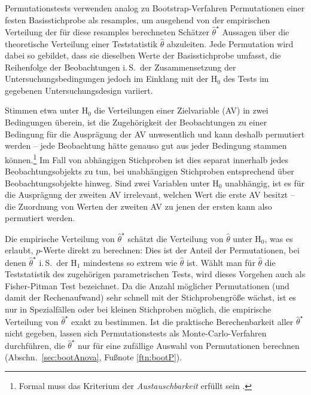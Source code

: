 Permutationstests \cite{Chihara2011,Good2004} verwenden analog zu Bootstrap-Verfahren Permutationen einer festen Basisstichprobe als resamples, um ausgehend von der empirischen Verteilung der für diese resamples berechneten Schätzer $\hat{\theta}^{\star}$ Aussagen über die theoretische Verteilung einer Teststatistik $\hat{\theta}$ abzuleiten. Jede Permutation wird dabei so gebildet, dass sie dieselben Werte der Basisstichprobe umfasst, die Reihenfolge der Beobachtungen i.\,S.\ der Zusammensetzung der Untersuchungsbedingungen jedoch im Einklang mit der $\text{H}_{0}$ des Tests im gegebenen Untersuchungsdesign variiert.

Stimmen etwa unter $\text{H}_{0}$ die Verteilungen einer Zielvariable (AV) in zwei Bedingungen überein, ist die Zugehörigkeit der Beobachtungen zu einer Bedingung für die Ausprägung der AV unwesentlich und kann deshalb permutiert werden -- jede Beobachtung hätte genauso gut aus jeder Bedingung stammen können.\footnote{Formal muss das Kriterium der \emph{Austauschbarkeit} erfüllt sein \cite{Good2004}.} Im Fall von abhängigen Stichproben ist dies separat innerhalb jedes Beobachtungsobjekts zu tun, bei unabhängigen Stichproben entsprechend über Beobachtungsobjekte hinweg. Sind zwei Variablen unter $\text{H}_{0}$ unabhängig, ist es für die Ausprägung der zweiten AV irrelevant, welchen Wert die erste AV besitzt -- die Zuordnung von Werten der zweiten AV zu jenen der ersten kann also permutiert werden.

Die empirische Verteilung von $\hat{\theta}^{\star}$ schätzt die Verteilung von $\hat{\theta}$ unter $\text{H}_{0}$, was es erlaubt, $p$-Werte direkt zu berechnen: Dies ist der Anteil der Permutationen, bei denen $\hat{\theta}^{\star}$ i.\,S.\ der $\text{H}_{1}$ mindestens so extrem wie $\hat{\theta}$ ist. Wählt man für $\hat{\theta}$ die Teststatistik des zugehörigen parametrischen Tests, wird dieses Vorgehen auch als Fisher-Pitman Test bezeichnet. Da die Anzahl möglicher Permutationen (und damit der Rechenaufwand) sehr schnell mit der Stichprobengröße wächst, ist es nur in Spezialfällen oder bei kleinen Stichproben möglich, die empirische Verteilung von $\hat{\theta}^{\star}$ exakt zu bestimmen. Ist die praktische Berechenbarkeit aller $\hat{\theta}^{\star}$ nicht gegeben, lassen sich Permutationstests als Monte-Carlo-Verfahren durchführen, die $\hat{\theta}^{\star}$ nur für eine zufällige Auswahl von Permutationen berechnen (Abschn.\ \ref{sec:bootAnova}, Fußnote \ref{ftn:bootP}).

